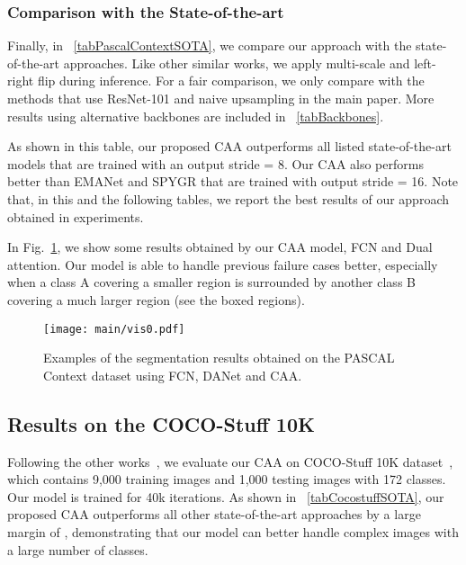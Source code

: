 \documentclass[letterpaper]{article} \usepackage{aaai22}  \usepackage{times}  \usepackage{helvet}  \usepackage{courier}  \usepackage[hyphens]{url}  \usepackage{graphicx} \urlstyle{rm} \def\UrlFont{\rm}  \usepackage{natbib}  \usepackage{caption} \DeclareCaptionStyle{ruled}{labelfont=normalfont,labelsep=colon,strut=off} \frenchspacing  \setlength{\pdfpagewidth}{8.5in}  \setlength{\pdfpageheight}{11in}  \usepackage{algorithm}
\begin{document}
\subsubsection{Comparison with the State-of-the-art}
\label{lab:PascalCtxSOTA}

Finally,  in \tablename{~\ref{tabPascalContextSOTA}}, we compare our approach with the state-of-the-art approaches. 
Like other similar works, we apply multi-scale and left-right flip during inference. 
For a fair comparison, we only compare with the methods that use ResNet-101 and naive upsampling in the main paper. More results using alternative backbones are included in \tablename{~\ref{tabBackbones}}.

As shown in this table, our proposed CAA outperforms all listed state-of-the-art models that are trained with an output stride = 8. 
Our CAA also performs better than EMANet and SPYGR that are trained with output stride = 16.  
Note that, in this and the following tables, we report the best results of our approach obtained in experiments.

In Fig.~\ref{fvis0}, we show some results obtained by our CAA model, FCN and Dual attention.
Our model is able to handle previous failure cases better, especially when a class A covering a smaller region is surrounded by another class B covering a much larger region (see the boxed regions).

\begin{figure}[t]
	\centering
\texttt{[image: main/vis0.pdf]}
	\caption{Examples of the segmentation results obtained on the PASCAL Context dataset using FCN, DANet and CAA. }
	\label{fvis0}
\end{figure}


\subsection{Results on the COCO-Stuff 10K}

Following the other works~\cite{cDualAttention}, we evaluate our CAA on COCO-Stuff 10K dataset~\cite{cCocoStuff}, which contains 9,000 training images and 1,000 testing images with 172 classes. Our model is trained for 40k iterations.
As shown in \tablename{~\ref{tabCocostuffSOTA}}, our proposed CAA outperforms all other state-of-the-art approaches by a large margin of , demonstrating that our model can better handle complex images with a large number of classes.
\end{document}
